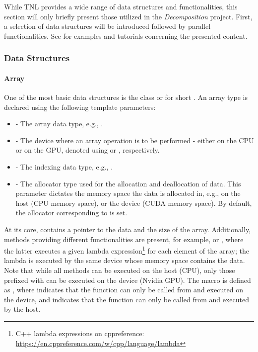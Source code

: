 While TNL provides a wide range of data structures and functionalities, this section will only briefly present those utilized in the \textit{Decomposition} project. First, a selection of data structures will be introduced followed by parallel functionalities. See  \cite{ixA8ZYptYohwlgwt} for examples and tutorials concerning the presented content.

\subsubsection{Data Structures}

\paragraph{Array} One of the most basic data structures is the  class or  for short \cite{ixA8ZYptYohwlgwt}. An array type is declared using the following template parameters:

\begin{itemize}
	\item {} - The array data type, e.g., .
	\item {} - The device where an array operation is to be performed - either on the CPU or on the GPU, denoted using  or , respectively.
	\item {} - The indexing data type, e.g., .
	\item {} - The allocator type used for the allocation and deallocation of data. This parameter dictates the memory space the data is allocated in, e.g., on the host (CPU memory space), or the device (CUDA memory space). By default, the allocator corresponding to  is set.
\end{itemize}

At its core,  contains a pointer to the data and the size of the array. Additionally, methods providing different functionalities are present, for example,  or , where the latter executes a given lambda expression\footnote{C++ lambda expressions on cppreference: \url{https://en.cppreference.com/w/cpp/language/lambda}} for each element of the array; the lambda is executed by the same device whose memory space contains the data. Note that while all methods can be executed on the host (CPU), only those prefixed with  can be executed on the device (Nvidia GPU). The  macro is defined as , where  indicates that the function can only be called from and executed on the device, and  indicates that the function can only be called from and executed by the host.


